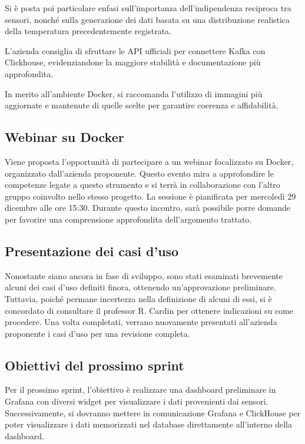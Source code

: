 \documentclass{article}
\begin{document}
Si è posta poi particolare enfasi sull'importanza dell'indipendenza reciproca tra sensori, nonché sulla generazione dei dati basata su una distribuzione realistica della temperatura precedentemente registrata.

L'azienda consiglia di sfruttare le API ufficiali per connettere Kafka con Clickhouse, evidenziandone la maggiore stabilità e documentazione più approfondita.

In merito all'ambiente Docker, si raccomanda l'utilizzo di immagini più aggiornate e mantenute di quelle scelte per garantire coerenza e affidabilità.

\subsection{Webinar su Docker}
Viene proposta l'opportunità di partecipare a un webinar focalizzato su Docker, organizzato dall'azienda proponente. Questo evento mira a approfondire le competenze legate a questo strumento e si terrà in collaborazione con l'altro gruppo coinvolto nello stesso progetto.
La sessione è pianificata per mercoledì 29 dicembre alle ore 15:30. Durante questo incontro, sarà possibile porre domande per favorire una comprensione approfondita dell'argomento trattato.

\subsection{Presentazione dei casi d'uso}
Nonostante siano ancora in fase di sviluppo, sono stati esaminati brevemente alcuni dei casi d'uso definiti finora, ottenendo un'approvazione preliminare.
Tuttavia, poiché permane incertezza nella definizione di alcuni di essi, si è concordato di consultare il professor R. Cardin per ottenere indicazioni su come procedere.
Una volta completati, verrano nuovamente presentati all'azienda proponente i casi d'uso per una revisione completa.

\subsection{Obiettivi del prossimo sprint}
Per il prossimo sprint, l'obiettivo è realizzare una dashboard preliminare in Grafana con diversi widget per visualizzare i dati provenienti dai sensori. Successivamente, si dovranno mettere in comunicazione Grafana e ClickHouse per poter visualizzare i dati memorizzati nel database direttamente all'interno della dashboard.
\end{document}
